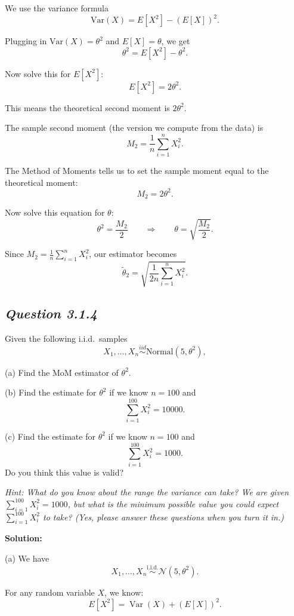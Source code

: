 \documentclass[11pt,letterpaper]{article}
\theoremstyle{remark}
\begin{document}
We use the variance formula
\[
\mathrm{Var}(X) = E[X^{2}] - (E[X])^{2}.
\]

Plugging in $\mathrm{Var}(X)=\theta^{2}$ and $E[X]=\theta$, we get
\[
\theta^{2} = E[X^{2}] - \theta^{2}.
\]

Now solve this for $E[X^{2}]$:
\[
E[X^{2}] = 2\theta^{2}.
\]

This means the theoretical second moment is $2\theta^{2}$.

The sample second moment (the version we compute from the data) is
\[
M_{2} = \frac{1}{n}\sum_{i=1}^{n} X_{i}^{2}.
\]

The Method of Moments tells us to set the sample moment equal to the
theoretical moment:
\[
M_{2} = 2\theta^{2}.
\]

Now solve this equation for $\theta$:
\[
\theta^{2} = \frac{M_{2}}{2}
\qquad\Longrightarrow\qquad
\theta = \sqrt{\frac{M_{2}}{2}}.
\]

Since $M_{2} = \frac{1}{n}\sum_{i=1}^n X_i^2$, our estimator becomes
\[
\boxed{
\tilde{\theta}_{2}
=
\sqrt{\frac{1}{2n}\sum_{i=1}^{n} X_{i}^{2}}
}.
\]

\subsection*{\textit{Question 3.1.4}}

Given the following i.i.d.\ samples
\[
X_1, \ldots, X_n \stackrel{iid}{\sim} \text{Normal}(5, \theta^2),
\]

(a) Find the MoM estimator of $\theta^2$.

(b) Find the estimate for $\theta^2$ if we know $n = 100$ and
\[
\sum_{i=1}^{100} X_i^2 = 10000.
\]

(c) Find the estimate for $\theta^2$ if we know $n = 100$ and
\[
\sum_{i=1}^{100} X_i^2 = 1000.
\]
Do you think this value is valid?

\textit{Hint: What do you know about the range the variance can take?
We are given $\sum_{i=1}^{100} X_i^2 = 1000$, but what is the minimum possible value you could expect $\sum_{i=1}^{100} X_i^2$ to take? (Yes, please answer these questions when you turn it in.)}

\vspace{1cm}

\textbf{Solution:}

(a) We have
\[
X_1,\dots,X_n \overset{\text{i.i.d.}}{\sim} \mathcal{N}(5,\theta^2).
\]

For any random variable $X$, we know:
\[
E[X^2] = \operatorname{Var}(X) + (E[X])^2.
\]
\end{document}
